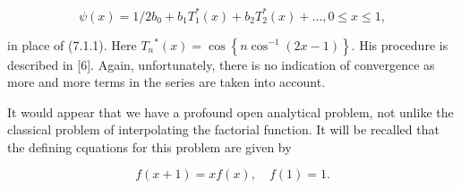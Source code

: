 \documentclass[10pt]{article}
\begin{document}
$$
\psi(x)=1 / 2 b_{0}+b_{1} T_{1}^{*}(x)+b_{2} T_{2}^{*}(x)+\ldots, 0 \leqslant x \leqslant 1,
$$

in place of (7.1.1). Here $T_{n}{ }^{*}(x)=\cos \left\{n \cos ^{-1}(2 x-1)\right\}$. His procedure is described in [6]. Again, unfortunately, there is no indication of convergence as more and more terms in the series are taken into account.

It would appear that we have a profound open analytical problem, not unlike the classical problem of interpolating the factorial function. It will be recalled that the defining cquations for this problem are given by


\begin{equation*}
f(x+1)=x f(x), \quad f(1)=1 . \tag{7.1.3}
\end{equation*}
\end{document}
